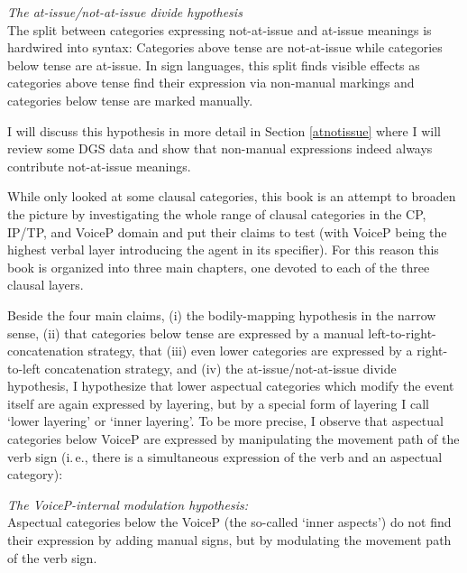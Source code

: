 \clearpage

\begin{exe}
\ex \textit{The at-issue/not-at-issue divide hypothesis} \\
The split between categories expressing not-at-issue and at-issue meanings is hardwired into syntax: Categories above tense are not-at-issue while categories below tense are at-issue.\label{atissuenotatissuedivide} In sign languages, this split finds visible effects as categories above tense find their expression via non-manual markings and categories below tense are marked manually.
\end{exe}

\noindent I will discuss this hypothesis in more detail in Section \ref{atnotissue} where I will review some DGS data and show that non-manual expressions indeed always contribute not-at-issue meanings. 

While \citet{bross2017scope} only looked at some clausal categories, this book is an attempt to broaden the picture by investigating the whole range of clausal categories in the CP, IP/TP, and VoiceP domain and put their claims to test (with VoiceP being the highest verbal layer introducing the agent in its specifier). For this reason this book is organized into three main chapters, one devoted to each of the three clausal layers. 

Beside the four main claims, (i) the bodily-mapping hypothesis in the narrow sense, (ii) that categories below tense are expressed by a manual left-to-right-concatenation strategy, that (iii) even lower categories are expressed by a right-to-left concatenation strategy, and (iv) the at-issue/not-at-issue divide hypothesis, I hypothesize that lower aspectual categories which modify the event itself are again expressed by layering, but by a special form of layering I call `lower layering' or `inner layering'. To be more precise, I observe that aspectual categories below VoiceP are expressed by manipulating the movement path of the verb sign (i.\,e., there is a simultaneous expression of the verb and an aspectual category):

\begin{exe}
\ex \textit{The VoiceP-internal modulation hypothesis:}\\
Aspectual categories below the VoiceP (the so-called `inner aspects') do not find their expression by adding manual signs, but by modulating the movement path of the verb sign. \label{vpinternalmodhyp}
\end{exe}

